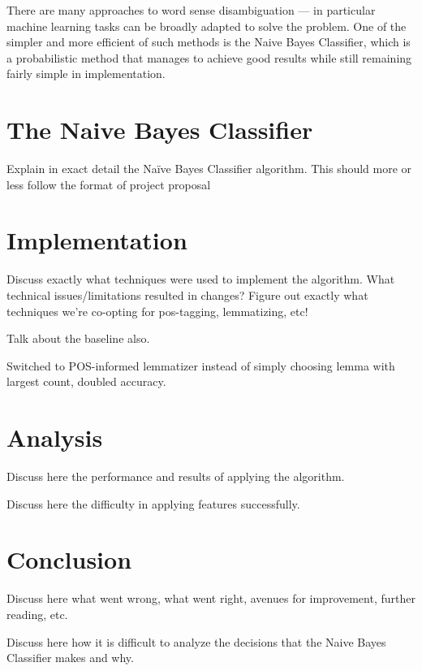 \documentclass[11pt]{article}
\begin{document}
There are many approaches to word sense disambiguation — in particular machine learning tasks can be broadly adapted to solve the problem. One of the simpler and more efficient of such methods is the Naive Bayes Classifier, which is a probabilistic method that manages to achieve good results while still remaining fairly simple in implementation.

\section{The Naive Bayes Classifier}
Explain in exact detail the Naïve Bayes Classifier algorithm. This should more or less follow the format of project proposal

\section{Implementation}
Discuss exactly what techniques were used to implement the algorithm. What technical issues/limitations resulted in changes? Figure out exactly what techniques we're co-opting for pos-tagging, lemmatizing, etc!

Talk about the baseline also.

Switched to POS-informed lemmatizer instead of simply choosing lemma with largest count, doubled accuracy.

\section{Analysis}
Discuss here the performance and results of applying the algorithm.

Discuss here the difficulty in applying features successfully.

\section{Conclusion}
Discuss here what went wrong, what went right, avenues for improvement, further reading, etc.

Discuss here how it is difficult to analyze the decisions that the Naive Bayes Classifier makes and why.
\end{document}
